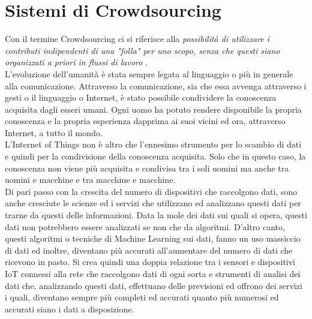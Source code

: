 \chapter{Sistemi di Crowdsourcing}
\label{chap:due}
Con il termine Crowdsourcing ci si riferisce alla \textit{possibilità di utilizzare i contributi indipendenti di una "folla" per uno scopo, senza che questi siano organizzati a priori in flussi di lavoro} \cite{book:wikipedia_crowdsourcing}.\\
L'evoluzione dell'umanità è stata sempre legata al linguaggio o più in generale alla comunicazione. Attraverso la comunicazione, sia che essa avvenga attraverso i gesti o il linguaggio o Internet, è stato possibile condividere la conoscenza acquisita dagli esseri umani. Ogni uomo ha potuto rendere disponibile la propria conoscenza e la propria esperienza dapprima ai suoi vicini ed ora, attraverso Internet, a tutto il mondo.\\
L'Internet of Things non è altro che l'ennesimo strumento per lo scambio di dati e quindi per la condivisione della conoscenza acquisita. Solo che in questo caso, la conoscenza non viene più acquisita e condivisa tra i soli uomini ma anche tra uomini e macchine e tra macchine e macchine.\\
Di pari passo con la crescita del numero di dispositivi che raccolgono dati, sono anche cresciute le scienze ed i servizi che utilizzano ed analizzano questi dati per trarne da questi delle informazioni. Data la mole dei dati sui quali si opera, questi dati non potrebbero essere analizzati se non che da algoritmi. D'altro canto, questi algoritmi o tecniche di Machine Learning sui dati, fanno un uso massiccio di dati ed inoltre, diventano più accurati all'aumentare del numero di dati che ricevono in pasto. Si crea quindi una doppia relazione tra i sensori e dispositivi IoT connessi alla rete che raccolgono dati di ogni sorta e strumenti di analisi dei dati che, analizzando questi dati, effettuano delle previsioni ed offrono dei servizi i quali, diventano sempre più completi ed accurati quanto più numerosi ed accurati siano i dati a disposizione.
